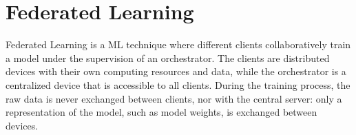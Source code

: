 

\section{Federated Learning}\label{fundamentals:federated_learning}


Federated Learning is a ML technique where different clients collaboratively train a model under the supervision of an orchestrator. The clients are distributed devices with their own computing resources and data, while the orchestrator is a centralized device that is accessible to all clients. During the training process, the raw data is never exchanged between clients, nor with the central server: only a representation of the model, such as model weights, is exchanged between devices.


    
    
